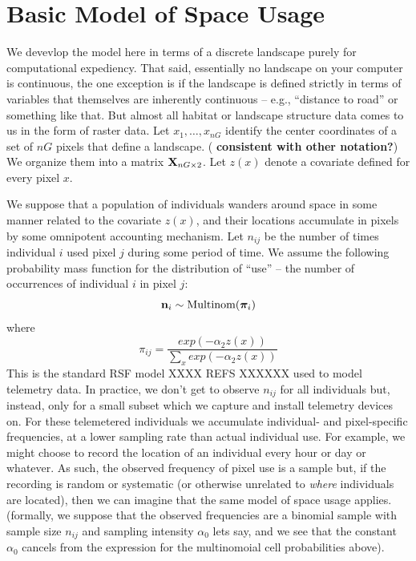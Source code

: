 \section{Basic Model of Space Usage}
\label{rsf.sec.rsfmodel}

We devevlop the model here in terms of a discrete landscape purely for
computational expediency. That said, essentially no landscape on your
computer is continuous, the one exception is if the landscape is
defined strictly in terms of variables that themselves are inherently
continuous -- e.g., ``distance to road'' or something like that.  But
almost all habitat or landscape structure data comes to us in the form
of raster data.  Let $x_{1},\ldots,x_{nG}$ identify the center
coordinates of a set of $nG$ pixels that define a landscape. ({\bf
  consistent with other notation?}) We organize them into a matrix
${\bf X}_{nG \times 2}$.  Let $z(x)$ denote a covariate defined for
every pixel $x$.

We suppose that a population of individuals wanders around space in
some manner related to the covariate $z(x)$, and their locations
accumulate in pixels by some omnipotent accounting mechanism. Let
$n_{ij}$ be the number of times individual $i$ used pixel $j$ during
some period of time.  We assume the following probability mass
function for the distribution of ``use'' -- the number of occurrences
of individual $i$ in pixel $j$:
\[
{\bf n}_{i} \sim \mbox{Multinom}({\bm \pi}_{i})
\]
where
\[
 \pi_{ij} = \frac{ exp( -\alpha_{2} z(x) ) }{ \sum_{x} exp(-\alpha_{2} z(x))} 
\]
This is the standard RSF model XXXX REFS XXXXXX used to model
telemetry data.  In practice, we don't get to observe $n_{ij}$ for all
individuals but, instead, only for a small subset which we capture and
install telemetry devices on.  For these telemetered individuals we
accumulate individual- and pixel-specific frequencies, at a lower
sampling rate than actual individual use. For example, we might choose
to record the location of an individual every hour or day or
whatever. As such, the observed frequency of pixel use is a sample
but, if the recording is random or systematic (or otherwise unrelated
to {\it where} individuals are located), then we can imagine that the
same model of space usage applies. (formally, we suppose that the
observed frequencies are a binomial sample with sample size $n_{ij}$
and sampling intensity $\alpha_{0}$ lets say, and we see that the
constant $\alpha_{0}$ cancels from the expression for the multinomoial
cell probabilities above).

